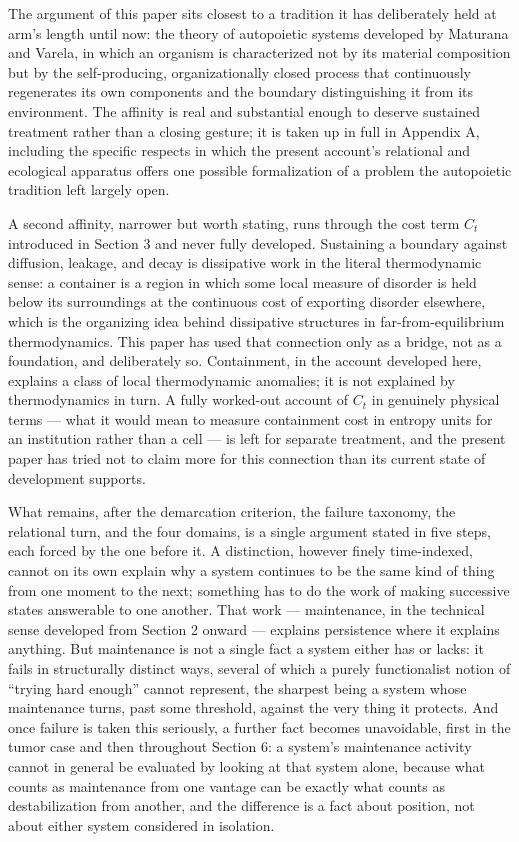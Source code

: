 \documentclass[11pt]{article}
\theoremstyle{plain}
\begin{document}
The argument of this paper sits closest to a tradition it has deliberately held at arm's length until now: the theory of autopoietic systems developed by Maturana and Varela, in which an organism is characterized not by its material composition but by the self-producing, organizationally closed process that continuously regenerates its own components and the boundary distinguishing it from its environment. The affinity is real and substantial enough to deserve sustained treatment rather than a closing gesture; it is taken up in full in Appendix A, including the specific respects in which the present account's relational and ecological apparatus offers one possible formalization of a problem the autopoietic tradition left largely open.

A second affinity, narrower but worth stating, runs through the cost term \(C_t\) introduced in Section 3 and never fully developed. Sustaining a boundary against diffusion, leakage, and decay is dissipative work in the literal thermodynamic sense: a container is a region in which some local measure of disorder is held below its surroundings at the continuous cost of exporting disorder elsewhere, which is the organizing idea behind dissipative structures in far-from-equilibrium thermodynamics. This paper has used that connection only as a bridge, not as a foundation, and deliberately so. Containment, in the account developed here, explains a class of local thermodynamic anomalies; it is not explained by thermodynamics in turn. A fully worked-out account of \(C_t\) in genuinely physical terms --- what it would mean to measure containment cost in entropy units for an institution rather than a cell --- is left for separate treatment, and the present paper has tried not to claim more for this connection than its current state of development supports.

What remains, after the demarcation criterion, the failure taxonomy, the relational turn, and the four domains, is a single argument stated in five steps, each forced by the one before it. A distinction, however finely time-indexed, cannot on its own explain why a system continues to be the same kind of thing from one moment to the next; something has to do the work of making successive states answerable to one another. That work --- maintenance, in the technical sense developed from Section 2 onward --- explains persistence where it explains anything. But maintenance is not a single fact a system either has or lacks: it fails in structurally distinct ways, several of which a purely functionalist notion of ``trying hard enough'' cannot represent, the sharpest being a system whose maintenance turns, past some threshold, against the very thing it protects. And once failure is taken this seriously, a further fact becomes unavoidable, first in the tumor case and then throughout Section 6: a system's maintenance activity cannot in general be evaluated by looking at that system alone, because what counts as maintenance from one vantage can be exactly what counts as destabilization from another, and the difference is a fact about position, not about either system considered in isolation.
\end{document}
